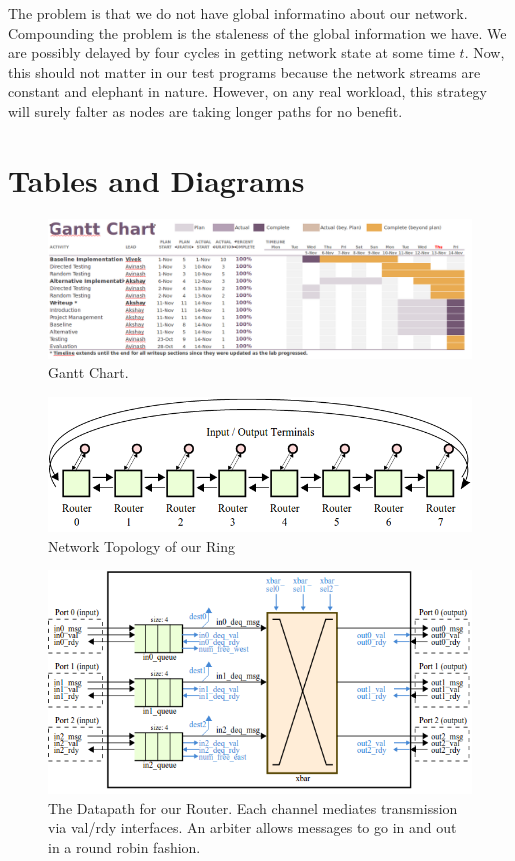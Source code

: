 \documentclass[10pt]{article}
\begin{document}
The problem is that we do not have global informatino about our network.
Compounding the problem is the staleness of the global information we have.
We are possibly delayed by four cycles in getting network state at some time
$t$. 
Now, this should not matter in our test programs because the network streams
are constant and elephant in nature. 
However, on any real workload, this strategy will surely falter as nodes 
are taking longer paths for no benefit. 

\newpage
\section {Tables and Diagrams}


\begin{figure}[h]
	\centering
	\includegraphics[scale=0.4, angle=90]{gantt}
	\caption{Gantt Chart.}
	\label{fig:gantt}
\end{figure}

\begin{figure}[h]
	\centering
	\includegraphics[scale=0.5]{topology}
	\caption{Network Topology of our Ring}
	\label{fig:topo}
\end{figure}

\begin{figure}[h]
	\centering
	\includegraphics[scale=0.7]{dpath}
	\caption
	{
		The Datapath for our Router.
		Each channel mediates transmission via val/rdy interfaces.
		An arbiter allows messages to go in and out in a round robin fashion.
	}
	\label{fig:dpath}
\end{figure}
\end{document}
